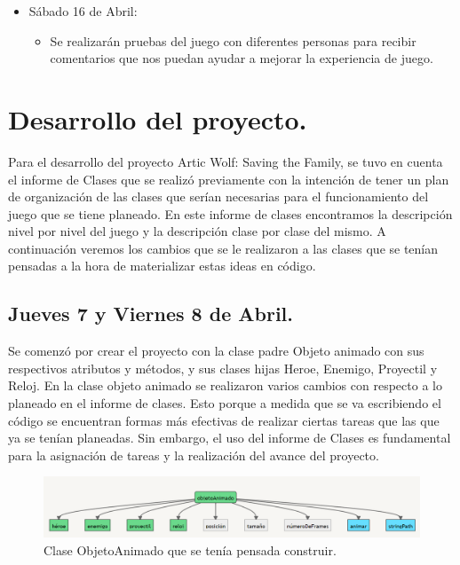 \documentclass{article}
\begin{document}
\begin{itemize}
    \item Sábado 16 de Abril:
    \begin{itemize}
        \item Se realizarán pruebas del juego con diferentes personas para recibir comentarios que nos puedan ayudar a mejorar la experiencia de juego.
    \end{itemize}
    
    
\end{itemize}

\section{Desarrollo del proyecto.}
Para el desarrollo del proyecto Artic Wolf: Saving the Family, se tuvo en cuenta el informe de Clases que se realizó previamente con la intención de tener un plan de organización de las clases que serían necesarias para el funcionamiento del juego que se tiene planeado. En este informe de clases encontramos la descripción nivel por nivel del juego y la descripción clase por clase del mismo. A continuación veremos los cambios que se le realizaron a las clases que se tenían pensadas a la hora de materializar estas ideas en código.

\subsection{Jueves 7 y Viernes 8 de Abril.}

Se comenzó por crear el proyecto con la clase padre Objeto animado con sus respectivos atributos y métodos, y sus clases hijas Heroe, Enemigo, Proyectil y Reloj.
En la clase objeto animado se realizaron varios cambios con respecto a lo planeado en el informe de clases. Esto porque a medida que se va escribiendo el código se encuentran formas más efectivas de realizar ciertas tareas que las que ya se tenían planeadas. Sin embargo, el uso del informe de Clases es fundamental para la asignación de tareas y la realización del avance del proyecto.

\begin{figure}[h]
\includegraphics[scale=0.5]{Images/ObjetoAnimado.png}
\centering
\caption{Clase ObjetoAnimado que se tenía pensada construir.}
\label{fig:objetoAnimado}
\end{figure}
\end{document}
